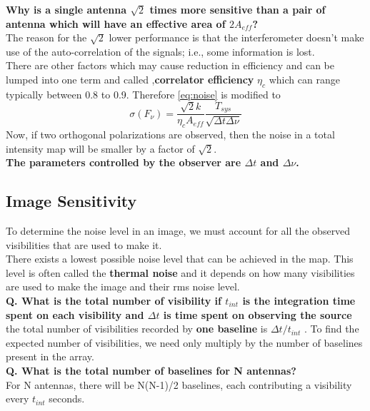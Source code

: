 \documentclass[10pt]{report}
\newcommand{\tbf}[1]{\textbf{#1}}
\begin{document}
 \tbf{Why is a single antenna $\sqrt{2}$ times more sensitive than a pair of antenna which will have an effective area of $2A_{eff}$?}\\
  The reason for the $\sqrt{2}$ lower performance is that the interferometer doesn't make use of the auto-correlation of the signals; i.e., some information is lost. \\
  
  
  There are other factors which may cause reduction in efficiency and can be lumped into one term and called ,\tbf{correlator efficiency} $\eta_c$ which can range typically between 0.8 to 0.9. Therefore \eqref{eq:noise} is modified to
   \begin{equation}\label{eq:noise}
 \sigma(F_\nu)=\frac{\sqrt{2}k}{\eta_c A_{eff}}\frac{T_{sys}}{\sqrt{\Delta t \Delta \nu}}
 \end{equation}
  Now, if two orthogonal polarizations are observed, then the noise in a total intensity map will be smaller by a factor of $\sqrt{2}$.\\
  
  
  \tbf{The parameters controlled by the observer are $\Delta t$ and $\Delta \nu$.}
  
  \subsection{Image Sensitivity}
  To determine the noise level in an image, we must account for all the observed visibilities that are used to make it. \\
There exists a lowest possible noise level that can be achieved in the map.  This level is often called the\tbf{ thermal noise} and it depends on how many visibilities are used to make the image and their rms noise level.\\

\tbf{Q. What is the total number of visibility if $t_{int}$ is the integration time spent on each visibility and $\Delta t$ is time spent on observing the source}\\

the total number of visibilities recorded by \tbf{one baseline} is $\Delta t/t_{int}$ .  To find the expected number of visibilities, we need only multiply by the number of baselines present in the array.\\

\tbf{Q. What is the total number of baselines for N antennas?}\\

 For N antennas, there will be N(N-1)/2 baselines, each contributing a visibility every $t_{int}$ seconds.\\
 
\end{document}
